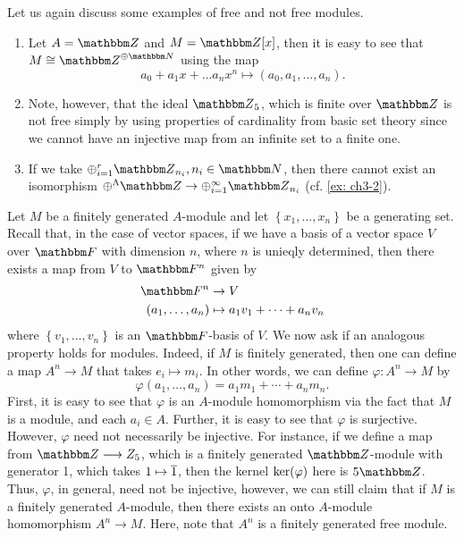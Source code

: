 \begin{example} 
Let us again discuss some examples of free and not free modules.
\begin{enumerate}
    \item  Let $A={\Z}$ and $M={\Z}[x]$, then it is easy to see that $M \cong {\Z}^{\oplus {\N}}$ using the map 
    \[
    a_{0}+a_{1} x+\ldots a_{n} x^{n} \mapsto (a_{0}, a_{1}, \ldots, a_{n}).
    \]
    \item Note, however, that the ideal ${\Z}_{5}$, which is finite over $\Z$ is not free simply by using properties of cardinality from basic set theory since we cannot have an injective map from an infinite set to a finite one.
    \item If we take $\oplus_{i=1}^{r} {\Z}_{n_{i}} , n_{i} \in {\N}$, then there cannot exist an isomorphism $\oplus^{\Lambda} {\Z} \rightarrow \oplus_{i=1}^{\infty} {\Z}_{n_{i}}$ (cf. \cref{ex: ch3-2}).
\end{enumerate}
\end{example}  

Let $M$ be a finitely generated $A$-module and let $\left\{x_{1}, \ldots, x_{n}\right\}$ be a generating set. Recall that, in the case of vector spaces, if we have a basis of a vector space $V$ over $\F$ with dimension $n$, where $n$ is unieqly determined, then there exists a map from $V$ to $\F^{n}$ given by 
$$
\begin{aligned}
\F^{n} & \rightarrow V \\
\left(a_{1}, \ldots, a_{n}\right) & \mapsto a_{1} v_{1}+\cdots+a_{n} v_{n}
\end{aligned}
$$
where $\left\{v_{1}, \ldots, v_{n}\right\}$ is an $\F$-basis of $V$. 
We now ask if an analogous property holds for modules. Indeed, if $M$ is finitely generated, then one can define a map 
$A^{n} \longrightarrow M$ that takes $e_{i} \mapsto m_{i}$. In other words, we can define $\varphi: A^{n} \longrightarrow M$ by 
\[
\varphi\left(a_{1}, \ldots, a_{n}\right)= a_{1} m_{1}+\cdots+a_{n} m_{n}.
\] 
First, it is easy to see that $\varphi$ is an $A$-module homomorphism via the fact that $M$ is a module, and each $a_i \in A$. Further, it is easy to see that $\varphi$ is surjective. However, $\varphi$ need not necessarily be injective. For instance, if we define a map from ${\Z} \longrightarrow Z_{5}$, which is a finitely generated ${\Z}$-module with generator 1, which takes $1 \mapsto \overline{1}$, then the kernel ${\operatorname{\text{ker\/}}}(\varphi)$ here is $5 {\Z}$. Thus, $\varphi$, in general, need not be injective, however, we can still claim that if $M$ is a  finitely generated $A$-module, then there exists an onto $A$-module homomorphism $A^{n} \longrightarrow M$. Here, note that $A^{n}$ is a finitely generated free module.

